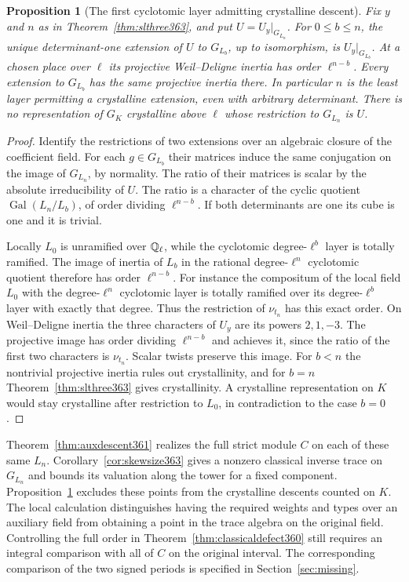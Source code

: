 \documentclass[a4paper,11pt]{article}
\newtheorem{proposition}{Proposition}[section]
\theoremstyle{definition}
\theoremstyle{remark}
\numberwithin{equation}{section}
\begin{document}
\begin{proposition}[The first cyclotomic layer admitting crystalline descent]
\label{prop:descentlayer363}
Fix \(y\) and \(n\) as in Theorem~\ref{thm:slthree363}, and put
\(U=U_y|_{G_{L_n}}\). For \(0\le b\le n\), the unique
determinant-one extension of \(U\) to \(G_{L_b}\), up to
isomorphism, is \(U_y|_{G_{L_b}}\). At a chosen place over
\(\ell\) its projective Weil--Deligne inertia has order
\(\ell^{n-b}\). Every extension to \(G_{L_b}\) has the same
projective inertia there. In particular \(n\) is the least
layer permitting a crystalline extension, even with arbitrary
determinant. There is no representation of \(G_K\) crystalline
above \(\ell\) whose restriction to \(G_{L_n}\) is \(U\).
\end{proposition}
\begin{proof}
Identify the restrictions of two extensions over an algebraic
closure of the coefficient field. For each \(g\in G_{L_b}\)
their matrices induce the same conjugation on the image of
\(G_{L_n}\), by normality. The ratio of their matrices is scalar
by the absolute irreducibility of \(U\). The ratio is a character
of the cyclic quotient \(\operatorname{Gal}(L_n/L_b)\), of
order dividing \(\ell^{n-b}\). If both determinants are one
its cube is one and it is trivial.

Locally \(L_0\) is unramified over \(\mathbb Q_\ell\), while the
cyclotomic degree-\(\ell^b\) layer is totally ramified. The
image of inertia of \(L_b\) in the rational degree-\(\ell^n\)
cyclotomic quotient therefore has order \(\ell^{n-b}\).
For instance the compositum of the local field \(L_0\) with the
degree-\(\ell^n\) cyclotomic layer is totally ramified over its
degree-\(\ell^b\) layer with exactly that degree. Thus the
restriction of \(\nu_{t_n}\) has this exact order. On
Weil--Deligne inertia the three characters of \(U_y\) are its
powers \(2,1,-3\). The projective image has order dividing
\(\ell^{n-b}\) and achieves it, since the ratio of the first
two characters is \(\nu_{t_n}\). Scalar twists preserve this
image. For \(b<n\) the nontrivial projective inertia rules
out crystallinity, and for \(b=n\) Theorem~\ref{thm:slthree363}
gives crystallinity. A crystalline representation on \(K\)
would stay crystalline after restriction to \(L_0\), in
contradiction to the case \(b=0\).
\end{proof}

Theorem~\ref{thm:auxdescent361} realizes the full strict module
\(C\) on each of these same \(L_n\). Corollary~\ref{cor:skewsize363}
gives a nonzero classical inverse trace on \(G_{L_n}\) and
bounds its valuation along the tower for a fixed component.
Proposition~\ref{prop:descentlayer363} excludes these points
from the crystalline descents counted on \(K\). The local
calculation distinguishes having the required weights and
types over an auxiliary field from obtaining a point in
the trace algebra on the original field. Controlling the full order in
Theorem~\ref{thm:classicaldefect360} still requires an
integral comparison with all of \(C\) on the original interval.
The corresponding comparison of the two signed periods is
specified in Section~\ref{sec:missing}.
\end{document}
